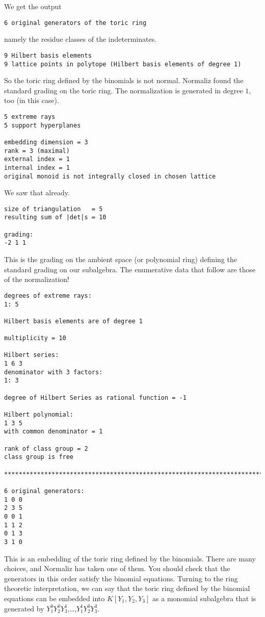 \documentclass[12pt,a4paper]{scrartcl}
\theoremstyle{definition}
\begin{document}
We get the output
\begin{Verbatim}
6 original generators of the toric ring
\end{Verbatim}
namely the residue classes of the indeterminates.
\begin{Verbatim}
9 Hilbert basis elements
9 lattice points in polytope (Hilbert basis elements of degree 1)
\end{Verbatim}
So the toric ring defined by the binomials is not normal. Normaliz found the standard grading on the toric ring. The normalization is generated in degree $1$, too (in this case). 
\begin{Verbatim}
5 extreme rays
5 support hyperplanes

embedding dimension = 3
rank = 3 (maximal)
external index = 1
internal index = 1
original monoid is not integrally closed in chosen lattice
\end{Verbatim}
We saw that already.
\begin{Verbatim}
size of triangulation   = 5
resulting sum of |det|s = 10

grading:
-2 1 1
\end{Verbatim}
This is the grading on the ambient space (or polynomial ring) defining the standard grading on our subalgebra. The enumerative data that follow are those of the normalization! 
\begin{Verbatim}
degrees of extreme rays:
1: 5  

Hilbert basis elements are of degree 1

multiplicity = 10

Hilbert series:
1 6 3 
denominator with 3 factors:
1: 3  

degree of Hilbert Series as rational function = -1

Hilbert polynomial:
1 3 5 
with common denominator = 1

rank of class group = 2
class group is free

***********************************************************************

6 original generators:
1 0 0
2 3 5
0 0 1
1 1 2
0 1 3
3 1 0
\end{Verbatim}
This is an embedding of the toric ring defined by the binomials. There are many choices, and Normaliz has taken one of them. You should check that the generators in this order satisfy the binomial equations. Turning to the ring theoretic interpretation, we can say that the toric ring defined by the binomial equations can be embedded into $K[Y_1,Y_2,Y_3]$ as a monomial subalgebra that is generated by $Y_1^0Y_2^0Y_3^1$,\dots,$Y_1^1Y_2^0Y_3^3$.
\end{document}
